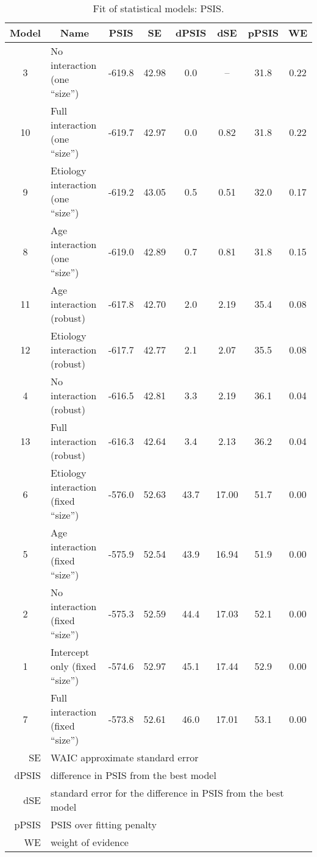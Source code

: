 %
\begin{table}[h!]
	\centering
	\begin{tabular}{|c|lcccccc|} 
		\hline
		Model & \multicolumn{1}{c}{Name} & PSIS & SE & dPSIS & dSE & pPSIS & WE \\[0.5ex] 
		\hline\hline
		\rowcolor{gray}
		3 & No interaction (one ``size'') & -619.8 & 42.98 & 0.0 & -- & 31.8 & 0.22 \\
		10 & Full interaction (one ``size'') & -619.7 & 42.97 & 0.0 & 0.82 & 31.8 & 0.22 \\
		\rowcolor{gray}
		9 & Etiology interaction (one ``size'') & -619.2 & 43.05 & 0.5 & 0.51 & 32.0 & 0.17 \\
		8 & Age interaction (one ``size'') & -619.0 & 42.89 & 0.7 & 0.81 & 31.8 & 0.15 \\
		\rowcolor{gray}
		11 & Age interaction (robust) & -617.8 & 42.70 & 2.0 & 2.19 & 35.4 & 0.08 \\
		12 & Etiology interaction (robust) & -617.7 & 42.77 & 2.1 & 2.07 & 35.5 & 0.08 \\
		\rowcolor{gray}
		4 & No interaction (robust) & -616.5 & 42.81 & 3.3 & 2.19 & 36.1 & 0.04 \\
		13 & Full interaction (robust) & -616.3 & 42.64 & 3.4 & 2.13 & 36.2 & 0.04 \\
		\rowcolor{gray}
		6 & Etiology interaction (fixed ``size'') & -576.0 & 52.63 & 43.7 & 17.00 & 51.7 & 0.00 \\
		5 & Age interaction (fixed ``size'') & -575.9 & 52.54 & 43.9 & 16.94 & 51.9 & 0.00 \\
		\rowcolor{gray}
		2 & No interaction (fixed ``size'') & -575.3 & 52.59 & 44.4 & 17.03 & 52.1 & 0.00 \\
		1 & Intercept only (fixed ``size'') & -574.6 & 52.97 & 45.1 & 17.44 & 52.9 & 0.00 \\
		\rowcolor{gray}
		7 & Full interaction (fixed ``size'') & -573.8 & 52.61 & 46.0 & 17.01 & 53.1 & 0.00 \\
		\hline\hline
		\multicolumn{1}{|r|}{\small SE} & \multicolumn{7}{l|}{\small WAIC approximate standard error} \\
		\multicolumn{1}{|r|}{\small dPSIS} & \multicolumn{7}{l|}{\small difference in PSIS from the best model} \\
		\multicolumn{1}{|r|}{\small dSE} & \multicolumn{7}{l|}{\small standard error for the difference in PSIS from the best model} \\
		\multicolumn{1}{|r|}{\small pPSIS} & \multicolumn{7}{l|}{\small PSIS over fitting penalty} \\
		\multicolumn{1}{|r|}{\small WE} & \multicolumn{7}{l|}{\small weight of evidence} \\
		\hline
	\end{tabular}
	\caption[Fit of statistical models: PSIS]{Fit of statistical models: PSIS.}
	\label{tab:PSIS}
\end{table}
%
%